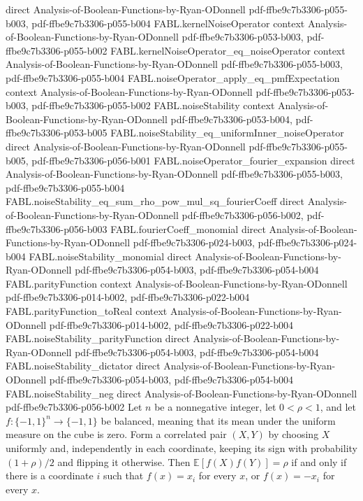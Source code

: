 \begin{theorem}
  {direct}
  {Analysis-of-Boolean-Functions-by-Ryan-ODonnell}
  {pdf-ffbe9c7b3306-p055-b003,
    pdf-ffbe9c7b3306-p055-b004}
\proofstep
  {FABL.kernelNoiseOperator}
  {context}
  {Analysis-of-Boolean-Functions-by-Ryan-ODonnell}
  {pdf-ffbe9c7b3306-p053-b003,
    pdf-ffbe9c7b3306-p055-b002}
\proofstep
  {FABL.kernelNoiseOperator_eq_noiseOperator}
  {context}
  {Analysis-of-Boolean-Functions-by-Ryan-ODonnell}
  {pdf-ffbe9c7b3306-p055-b003,
    pdf-ffbe9c7b3306-p055-b004}
\proofstep
  {FABL.noiseOperator_apply_eq_pmfExpectation}
  {context}
  {Analysis-of-Boolean-Functions-by-Ryan-ODonnell}
  {pdf-ffbe9c7b3306-p053-b003,
    pdf-ffbe9c7b3306-p055-b002}
\proofstep
  {FABL.noiseStability}
  {context}
  {Analysis-of-Boolean-Functions-by-Ryan-ODonnell}
  {pdf-ffbe9c7b3306-p053-b004,
    pdf-ffbe9c7b3306-p053-b005}
\proofstep
  {FABL.noiseStability_eq_uniformInner_noiseOperator}
  {direct}
  {Analysis-of-Boolean-Functions-by-Ryan-ODonnell}
  {pdf-ffbe9c7b3306-p055-b005,
    pdf-ffbe9c7b3306-p056-b001}
\proofstep
  {FABL.noiseOperator_fourier_expansion}
  {direct}
  {Analysis-of-Boolean-Functions-by-Ryan-ODonnell}
  {pdf-ffbe9c7b3306-p055-b003,
    pdf-ffbe9c7b3306-p055-b004}
\proofstep
  {FABL.noiseStability_eq_sum_rho_pow_mul_sq_fourierCoeff}
  {direct}
  {Analysis-of-Boolean-Functions-by-Ryan-ODonnell}
  {pdf-ffbe9c7b3306-p056-b002,
    pdf-ffbe9c7b3306-p056-b003}
\proofstep
  {FABL.fourierCoeff_monomial}
  {direct}
  {Analysis-of-Boolean-Functions-by-Ryan-ODonnell}
  {pdf-ffbe9c7b3306-p024-b003,
    pdf-ffbe9c7b3306-p024-b004}
\proofstep
  {FABL.noiseStability_monomial}
  {direct}
  {Analysis-of-Boolean-Functions-by-Ryan-ODonnell}
  {pdf-ffbe9c7b3306-p054-b003,
    pdf-ffbe9c7b3306-p054-b004}
\proofstep
  {FABL.parityFunction}
  {context}
  {Analysis-of-Boolean-Functions-by-Ryan-ODonnell}
  {pdf-ffbe9c7b3306-p014-b002,
    pdf-ffbe9c7b3306-p022-b004}
\proofstep
  {FABL.parityFunction_toReal}
  {context}
  {Analysis-of-Boolean-Functions-by-Ryan-ODonnell}
  {pdf-ffbe9c7b3306-p014-b002,
    pdf-ffbe9c7b3306-p022-b004}
\proofstep
  {FABL.noiseStability_parityFunction}
  {direct}
  {Analysis-of-Boolean-Functions-by-Ryan-ODonnell}
  {pdf-ffbe9c7b3306-p054-b003,
    pdf-ffbe9c7b3306-p054-b004}
\proofstep
  {FABL.noiseStability_dictator}
  {direct}
  {Analysis-of-Boolean-Functions-by-Ryan-ODonnell}
  {pdf-ffbe9c7b3306-p054-b003,
    pdf-ffbe9c7b3306-p054-b004}
\proofstep
  {FABL.noiseStability_neg}
  {direct}
  {Analysis-of-Boolean-Functions-by-Ryan-ODonnell}
  {pdf-ffbe9c7b3306-p056-b002}
Let $n$ be a nonnegative integer, let $0<\rho<1$, and let $f:\{-1,1\}^n\to\{-1,1\}$ be
balanced, meaning that its mean under the uniform measure on the cube is zero. Form a
correlated pair $(X,Y)$ by choosing $X$ uniformly and, independently in each coordinate,
keeping its sign with probability $(1+\rho)/2$ and flipping it otherwise. Then
$\mathbb{E}[f(X)f(Y)]=\rho$ if and only if there is a coordinate $i$ such that
$f(x)=x_i$ for every $x$, or $f(x)=-x_i$ for every $x$.
\end{theorem}

